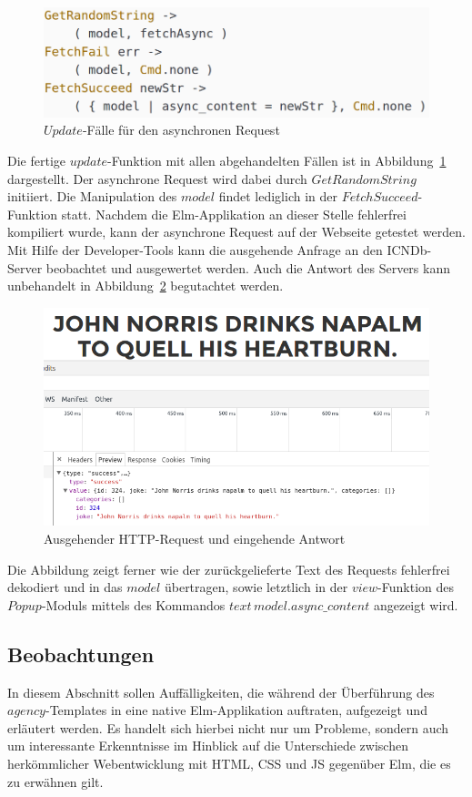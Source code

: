 \begin{figure}[h]
\centering
\includegraphics[scale=0.4]{img/update-async.png}
\caption{$Update$-Fälle für den asynchronen Request}\label{fig:update-async}
\end{figure}
Die fertige $update$-Funktion mit allen abgehandelten Fällen ist in Abbildung~\ref{fig:update-async} dargestellt. Der asynchrone Request wird dabei durch $GetRandomString$ initiiert. Die Manipulation des $model$ findet lediglich in der $FetchSucceed$-Funktion statt.
Nachdem die Elm-Applikation an dieser Stelle fehlerfrei kompiliert wurde, kann der asynchrone Request auf der Webseite getestet werden. Mit Hilfe der Developer-Tools kann die ausgehende Anfrage an den \ac{ICNDb}-Server beobachtet und ausgewertet werden. Auch die Antwort des Servers kann unbehandelt in Abbildung~\ref{fig:request-async} begutachtet werden.
\begin{figure}[htb]
\centering
\includegraphics[scale=0.4]{img/request-async.png}
\caption{Ausgehender HTTP-Request und eingehende Antwort}\label{fig:request-async}
\end{figure}
Die Abbildung zeigt ferner wie der zurückgelieferte Text des Requests fehlerfrei dekodiert und in das $model$ übertragen, sowie letztlich in der $view$-Funktion des $Popup$-Moduls mittels des Kommandos $text\,model.async\_content$ angezeigt wird.



\subsection{Beobachtungen}
\label{sec:Beobachtungen}
In diesem Abschnitt sollen Auffälligkeiten, die während der Überführung des $agency$-Templates in eine native Elm-Applikation auftraten, aufgezeigt und erläutert werden. Es handelt sich hierbei nicht nur um Probleme, sondern auch um interessante Erkenntnisse im Hinblick auf die Unterschiede zwischen herkömmlicher Webentwicklung mit \ac{HTML}, \ac{CSS} und \ac{JS} gegenüber Elm, die es zu erwähnen gilt.

